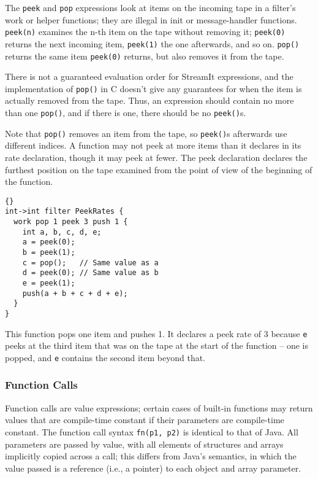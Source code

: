 \documentclass[11pt]{article}
\begin{document}
The \lstinline|peek| and \lstinline|pop| expressions look at items on
the incoming tape in a filter's work or helper functions; they are
illegal in init or message-handler functions.  \lstinline|peek(n)|
examines the n-th item on the tape without removing it;
\lstinline|peek(0)| returns the next incoming item,
\lstinline|peek(1)| the one afterwards, and so on.  \lstinline|pop()|
returns the same item \lstinline|peek(0)| returns, but also removes it
from the tape.

\begin{note}
There is not a guaranteed evaluation order for StreamIt expressions,
and the implementation of \lstinline|pop()| in C doesn't give any
guarantees for when the item is actually removed from the tape.  Thus,
an expression should contain no more than one \lstinline|pop()|, and
if there is one, there should be no \lstinline|peek()|s.
\end{note}

Note that \lstinline|pop()| removes an item from the tape, so
\lstinline|peek()|s afterwards use different indices.  A function may
not peek at more items than it declares in its rate declaration,
though it may peek at fewer.  The peek declaration declares the
furthest position on the tape examined from the point of view of the
beginning of the function.

\begin{lstlisting}{}
int->int filter PeekRates {
  work pop 1 peek 3 push 1 {
    int a, b, c, d, e;
    a = peek(0);
    b = peek(1);
    c = pop();   // Same value as a
    d = peek(0); // Same value as b
    e = peek(1);
    push(a + b + c + d + e);
  }
}
\end{lstlisting}

This function pops one item and pushes 1.  It declares a peek rate of
3 because \lstinline|e| peeks at the third item that was on the tape
at the start of the function -- one is popped, and \lstinline|e|
contains the second item beyond that.

\subsubsection{Function Calls}
\label{sec:expr-funcall}

Function calls are value expressions; certain cases of built-in
functions may return values that are compile-time constant if their
parameters are compile-time constant.  The function call syntax
\lstinline|fn(p1, p2)| is identical to that of Java.  All parameters
are passed by value, with all elements of structures and arrays
implicitly copied across a call; this differs from Java's semantics,
in which the value passed is a reference (i.e., a pointer) to each
object and array parameter.
\end{document}
